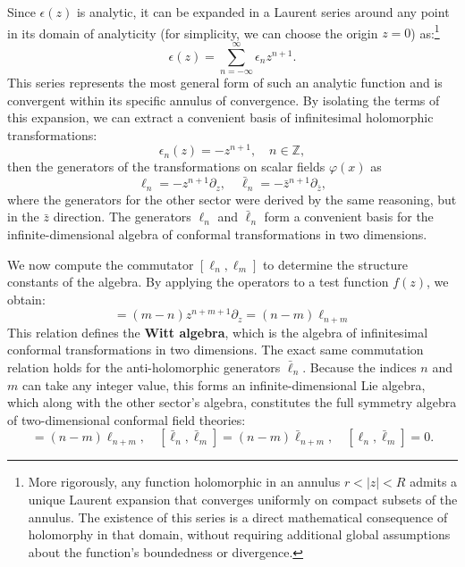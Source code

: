Since \(\epsilon(z)\) is analytic, it can be expanded in a Laurent series around any point in its domain of analyticity (for simplicity, we can choose the origin \(z=0\)) as:\footnote{More rigorously, any function holomorphic in an annulus $r < |z| < R$ admits a unique Laurent expansion that converges uniformly on compact subsets of the annulus. The existence of this series is a direct mathematical consequence of holomorphy in that domain, without requiring additional global assumptions about the function's boundedness or divergence.}
\[
    \epsilon(z) = \sum_{n = -\infty}^{\infty} \epsilon_n z^{n + 1}.
\]
This series represents the most general form of such an analytic function and is convergent within its specific annulus of convergence. By isolating the terms of this expansion, we can extract a convenient basis of infinitesimal holomorphic transformations:
\[
    \epsilon_n(z) = - z^{n + 1}, \quad n \in \mathbb{Z},
\]
then the generators of the transformations on scalar fields \(\varphi(x)\) as
\[
    \ell_n = - z^{n + 1} \partial_z, \quad \bar{\ell}_n = - \bar{z}^{n + 1} \partial_{\bar{z}},
\]
where the generators for the other sector were derived by the same reasoning, but in the \(\bar{z}\) direction. The generators \(\ell_n\) and \(\bar{\ell}_n\) form a convenient basis for the infinite-dimensional algebra of conformal transformations in two dimensions.

We now compute the commutator $[\ell_n, \ell_m]$ to determine the structure constants of the algebra. By applying the operators to a test function $f(z)$, we obtain:
\begin{equation}
    [\ell_n, \ell_m] = (m - n) z^{n + m + 1} \partial_z = (n - m) \ell_{n + m}
    \label{eq:witt_algebra}
\end{equation}
This relation defines the \textbf{Witt algebra}, which is the algebra of infinitesimal conformal transformations in two dimensions. The exact same commutation relation holds for the anti-holomorphic generators $\bar{\ell}_n$. Because the indices $n$ and $m$ can take any integer value, this forms an infinite-dimensional Lie algebra, which along with the other sector's algebra, constitutes the full symmetry algebra of two-dimensional conformal field theories:
\begin{equation}
    [\ell_n, \ell_m] = (n - m) \ell_{n + m}, \quad [\bar{\ell}_n, \bar{\ell}_m] = (n - m) \bar{\ell}_{n + m}, \quad [\ell_n, \bar{\ell}_m] = 0.
    \label{eq:2d_cft_witt_algebra}
\end{equation}

